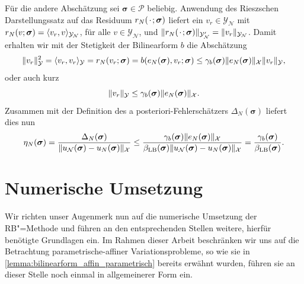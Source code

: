 \documentclass[../main.tex]{subfiles}
\begin{document}
\begin{Lemma}
\begin{Beweis}
        Für die andere Abschätzung sei $\bm \sigma \in \mathcal P$ beliebig.
        Anwendung des Rieszschen Darstellungssatz auf das Residuum $r_{N}({\mkern2mu\cdot\mkern2mu}; \bm \sigma)$ liefert ein $v_{r} \in \mathcal Y_{\mathcal N}$ mit $r_{N}(v; \bm \sigma) = \langle v_{r},v\rangle_{\mathcal Y_{\mathcal N}}$, für alle $v \in \mathcal Y_{\mathcal N}$, und $\lVert r_{N}({\mkern2mu\cdot\mkern2mu}; \bm \sigma)\rVert_{\mathcal Y_{\mathcal N}'} = \lVert v_{r}\rVert_{\mathcal Y_{\mathcal N}}$.
        Damit erhalten wir mit der Stetigkeit der Bilinearform $b$ die Abschätzung
        \begin{equation}
            \lVert v_{r}\rVert_{\mathcal Y}^{2}
            = \langle v_{r},v_{r}\rangle_{\mathcal Y}
            = r_{N}(v_{r}; \bm \sigma)
            = b(e_{N}(\bm \sigma), v_{r}; \bm \sigma)
            \leq \gamma_{b}(\bm \sigma) \lVert e_{N}(\bm \sigma)\rVert_{\mathcal X} \lVert v_{r}\rVert_{\mathcal Y},
        \end{equation}
        oder auch kurz
        \begin{equation}
            \lVert v_{r}\rVert_{\mathcal Y} \leq \gamma_{b}(\bm \sigma) \lVert e_{N}(\bm \sigma)\rVert_{\mathcal X}.
        \end{equation}
        Zusammen mit der Definition des a posteriori-Fehlerschätzers $\Delta_{N}(\bm \sigma)$ liefert dies nun
        \begin{equation}
            \eta_{N}(\bm \sigma)
            = \frac{\Delta_{N}(\bm \sigma)}{\lVert u_{\mathcal N}(\bm \sigma) - u_{N}(\bm \sigma)\rVert_{\mathcal X}}
            \leq \frac{\gamma_{b}(\bm \sigma) \lVert e_{N}(\bm \sigma)\rVert_{\mathcal X}}{\beta_{\mathrm{LB}}(\bm \sigma)\lVert u_{\mathcal N}(\bm \sigma) - u_{N}(\bm \sigma)\rVert_{\mathcal X}}
            = \frac{\gamma_{b}(\bm \sigma)}{\beta_{\mathrm{LB}}(\bm \sigma)}.
        \end{equation}
    \end{Beweis}
\end{Lemma}


\section{Numerische Umsetzung} %
\label{sub:grb:rb:numerische_umsetzung}

Wir richten unser Augenmerk nun auf die numerische Umsetzung der RB"=Methode und führen an den entsprechenden Stellen weitere, hierfür benötigte Grundlagen ein.
Im Rahmen dieser Arbeit beschränken wir uns auf die Betrachtung parametrische-affiner Variationsprobleme, so wie sie in \cref{lemma:bilinearform_affin_parametrisch} bereits erwähnt wurden, führen sie an dieser Stelle noch einmal in allgemeinerer Form ein.
\end{document}

